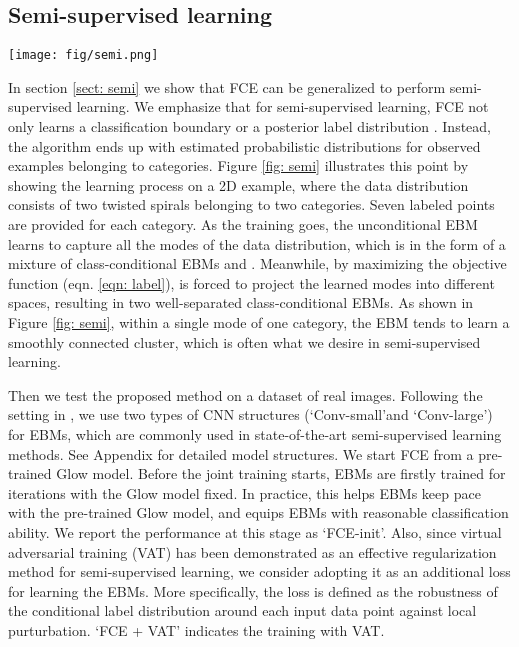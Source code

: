 \documentclass[10pt,twocolumn,letterpaper]{article}
\begin{document}
\subsection{Semi-supervised learning}
\begin{figure*}
\begin{center}
	\texttt{[image: fig/semi.png]}
    \label{fig: semi}
\end{center}
\end{figure*} 
In section \ref{sect: semi} we show that FCE can be generalized to perform semi-supervised learning. We emphasize that for semi-supervised learning, FCE not only learns a classification boundary or a posterior label distribution . Instead, the algorithm ends up with  estimated probabilistic distributions  for observed examples belonging to  categories. Figure \ref{fig: semi} illustrates this point by showing the learning process on a 2D example, where the data distribution consists of two twisted spirals belonging to two categories. Seven labeled points are provided for each category. As the training goes, the unconditional EBM  learns to capture all the modes of the data distribution, which is in the form of a mixture of class-conditional EBMs  and .  Meanwhile, by maximizing the objective function  (eqn. \ref{eqn: label}),  is forced to project the learned modes into different spaces, resulting in two well-separated class-conditional EBMs. As shown in Figure \ref{fig: semi}, within a single mode of one category, the EBM tends to learn a smoothly connected cluster, which is often what we desire in semi-supervised learning. 

Then we test the proposed method on a dataset of real images. Following the setting in \cite{miyato2018virtual}, we use two types of CNN structures (\lq Conv-small\rq  and \lq Conv-large\rq) for EBMs, which are commonly used in state-of-the-art semi-supervised learning methods. See Appendix for detailed model structures. We start FCE from a pre-trained Glow model. Before the joint training starts, EBMs are firstly trained for  iterations with the Glow model fixed. In practice, this helps EBMs keep pace with the pre-trained Glow model, and equips EBMs with reasonable classification ability. We report the performance at this stage as \lq FCE-init'. Also, since virtual adversarial training (VAT) \cite{miyato2018virtual} has been demonstrated as an effective regularization method for semi-supervised learning, we consider adopting it as an additional loss for learning the EBMs. More specifically, the loss is defined as the robustness of the conditional label distribution around each input data point against local purturbation. \lq FCE + VAT' indicates the training with VAT.
\end{document}
